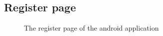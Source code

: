 \documentclass[11pt, a4paper]{article}
\begin{document}
\begin{appendices}
\subsection{Register page} %
\begin{figure}[ht]
\centering
{}
\caption{The register page of the android application}
\end{figure}
\clearpage


\end{appendices}
\end{document}
